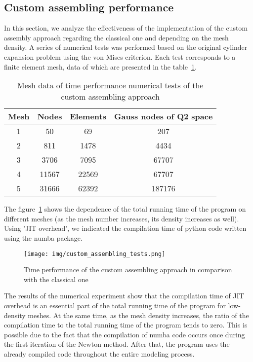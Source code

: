 \documentclass[12pt]{article}
\begin{document}
\subsection{Custom assembling performance}
\label{sec:custom_asssembling_performance}

In this section, we analyze the effectiveness of the implementation of the custom assembly approach regarding the classical one and depending on the mesh density. A series of numerical tests was performed based on the original cylinder expansion problem using the von Mises criterion. Each test corresponds to a finite element mesh, data of which are presented in the table~\ref{tab:custom_assembling_tests}. 

\begin{table}[H]
	\centering
	\begin{tabular}{|cccc|}
		\hline
		Mesh & Nodes & Elements & Gauss nodes of Q2 space \\
		\hline
		1 & 50	& 69 & 207 \\
		2 & 811 & 1478 & 4434 \\
		3 & 3706 & 7095 & 67707 \\
		4 & 11567 & 22569 & 67707 \\
		5 & 31666 & 62392 & 187176 \\
		\hline
	\end{tabular}
	\caption{Mesh data of time performance numerical tests of the custom assembling approach}
    \label{tab:custom_assembling_tests}
\end{table}

The figure~\ref{fig:custom_assembling_analysis} shows the dependence of the total running time of the program on different meshes (as the mesh number increases, its density increases as well). Using 'JIT overhead', we indicated the compilation time of python code written using the numba package.

\begin{figure}[H]
    \center
    \texttt{[image: img/custom\_assembling\_tests.png]}
    \caption{Time performance of the custom assembling approach in comparison with the classical one}
    \label{fig:custom_assembling_analysis}
\end{figure}

The results of the numerical experiment show that the compilation time of JIT overhead is an essential part of the total running time of the program for low-density meshes. At the same time, as the mesh density increases, the ratio of the compilation time to the total running time of the program tends to zero. This is possible due to the fact that the compilation of numba code occurs once during the first iteration of the Newton method. After that, the program uses the already compiled code throughout the entire modeling process.
\end{document}
